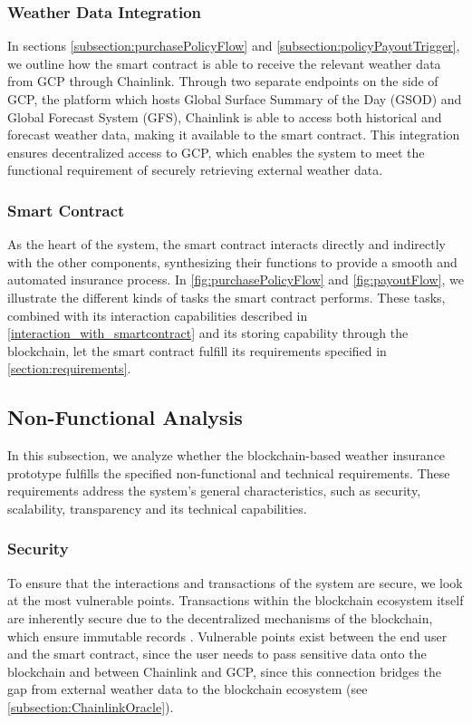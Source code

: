 \subsubsection{Weather Data Integration}
In sections \cref{subsection:purchasePolicyFlow} and \cref{subsection:policyPayoutTrigger}, we outline how the smart contract is able to receive the relevant weather data from GCP through Chainlink. Through two separate endpoints on the side of GCP, the platform which hosts Global Surface Summary of the Day (GSOD) and Global Forecast System (GFS), Chainlink is able to access both historical and forecast weather data, making it available to the smart contract. This integration ensures decentralized access to GCP, which enables the system to meet the functional requirement of securely retrieving external weather data.

\subsubsection{Smart Contract}
As the heart of the system, the smart contract interacts directly and indirectly with the other components, synthesizing their functions to provide a smooth and automated insurance process. In \cref{fig:purchasePolicyFlow} and \cref{fig:payoutFlow}, we illustrate the different kinds of tasks the smart contract performs. These tasks, combined with its interaction capabilities described in \cref{interaction_with_smartcontract} and its storing capability through the blockchain, let the smart contract fulfill its requirements specified in \cref{section:requirements}.

\subsection{Non-Functional Analysis}
In this subsection, we analyze whether the blockchain-based weather insurance prototype fulfills the specified non-functional and technical requirements. These requirements address the system's general characteristics, such as security, scalability, transparency and its technical capabilities.

\subsubsection{Security}
To ensure that the interactions and transactions of the system are secure, we look at the most vulnerable points. Transactions within the blockchain ecosystem itself are inherently secure due to the decentralized mechanisms of the blockchain, which ensure immutable records \autocite{Cheng2020A}. Vulnerable points exist between the end user and the smart contract, since the user needs to pass sensitive data onto the blockchain and between Chainlink and GCP, since this connection bridges the gap from external weather data to the blockchain ecosystem (see \cref{subsection:ChainlinkOracle}).

